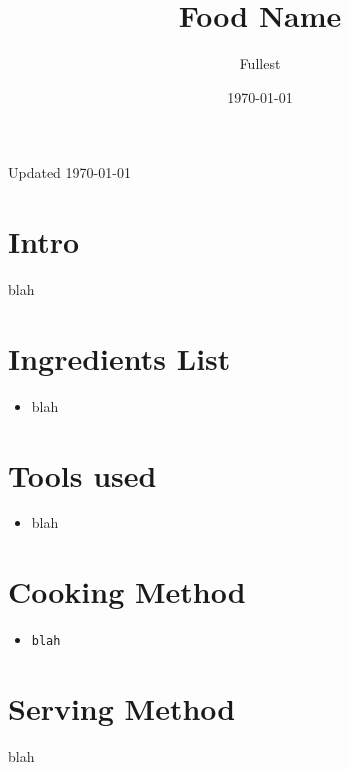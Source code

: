 \documentclass{article}
\title{\textbf{Food Name}}
\author{Fullest}
\date{\today}
\begin{document}
\maketitle
\thispagestyle{empty}

\begin{multicols}{2}


Updated \today
\section{Intro}
blah

\section{Ingredients List}
\begin{itemize}
	\item blah
\end{itemize}

\section{Tools used}
\begin{itemize}
	\item blah
\end{itemize}

\section{Cooking Method}
\begin{itemize}
	\item \verb|blah|
\end{itemize}

\section{Serving Method}
blah



\end{multicols}
\end{document}
